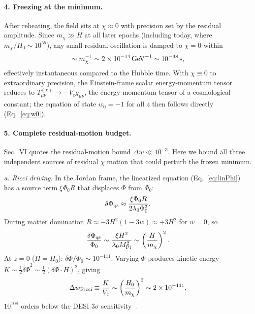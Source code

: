 \documentclass[pdflatex,sn-mathphys-num]{sn-jnl}
\newcommand{\MP}{M_{\rm Pl}}
\newcommand{\PhiV}{\Phi_0}
\theoremstyle{thmstyleone}
\begin{document}
\begin{appendices}
\paragraph{4. Freezing at the minimum.} After reheating, the field sits at $\chi\approx0$ with precision set by the residual amplitude. Since $m_\chi\gg H$ at all later epochs (including today, where $m_\chi/H_0\sim10^{55}$), any small residual oscillation is damped to $\chi=0$ within
\begin{equation}
\sim m_\chi^{-1}\sim2\times10^{-14}\,{\rm GeV}^{-1}\sim10^{-38}\,{\rm s},
\label{eq:D7}
\end{equation}
effectively instantaneous compared to the Hubble time. With $\chi\equiv0$ to extraordinary precision, the Einstein-frame scalar energy-momentum tensor reduces to $T^{(\chi)}_{\mu\nu}\to-V_c g_{\mu\nu}$, the energy-momentum tensor of a cosmological constant; the equation of state $w_0=-1$ for all $z$ then follows directly (Eq.~\eqref{eq:w0}).

\paragraph{5. Complete residual-motion budget.} Sec.~VI quotes the residual-motion bound $\Delta w\ll10^{-3}$. Here we bound all three independent sources of residual $\chi$ motion that could perturb the frozen minimum.

\emph{a. Ricci driving.} In the Jordan frame, the linearized equation (Eq.~\eqref{eq:linPhi}) has a source term $\xi\PhiV R$ that displaces $\Phi$ from $\PhiV$:
\begin{equation}
\delta\Phi_{\rm qs}\approx\frac{\xi\PhiV R}{2\lambda_0\PhiV^2}.
\label{eq:D8}
\end{equation}
During matter domination $R\approx-3H^2(1-3w)\approx+3H^2$ for $w=0$, so
\begin{equation}
\frac{\delta\Phi_{\rm qs}}{\PhiV}\sim\frac{\xi H^2}{\lambda_0\MP^2}\sim\left(\frac{H}{m_\chi}\right)^2.
\label{eq:D9}
\end{equation}
At $z=0$ ($H=H_0$): $\delta\Phi/\PhiV\sim10^{-111}$. Varying $\Phi$ produces kinetic energy $K\sim\frac12\dot{\delta\Phi}^2\sim\frac12(\delta\Phi\cdot H)^2$, giving
\begin{equation}
\Delta w_{\rm Ricci}\equiv\frac{K}{V_c}\sim\left(\frac{H_0}{m_\chi}\right)^2\sim2\times10^{-111},
\label{eq:D10}
\end{equation}
$10^{108}$ orders below the DESI $3\sigma$ sensitivity~\cite{DESI2024}.


\end{appendices}
\end{document}
